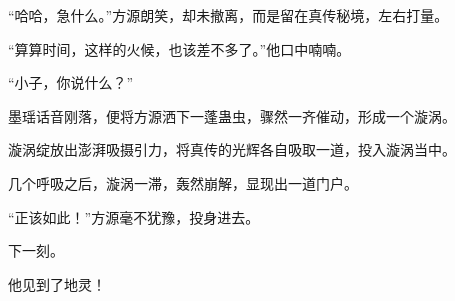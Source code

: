 \begin{this_body}
“哈哈，急什么。”方源朗笑，却未撤离，而是留在真传秘境，左右打量。

“算算时间，这样的火候，也该差不多了。”他口中喃喃。

“小子，你说什么？”

墨瑶话音刚落，便将方源洒下一蓬蛊虫，骤然一齐催动，形成一个漩涡。

漩涡绽放出澎湃吸摄引力，将真传的光辉各自吸取一道，投入漩涡当中。

几个呼吸之后，漩涡一滞，轰然崩解，显现出一道门户。

“正该如此！”方源毫不犹豫，投身进去。

下一刻。

他见到了地灵！

\end{this_body}

